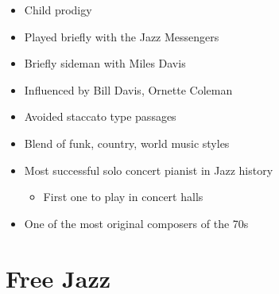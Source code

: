 \documentclass[]{article}
\providecommand{\tightlist}{%
  \setlength{\itemsep}{0pt}\setlength{\parskip}{0pt}}
\begin{document}
\begin{enumerate}
  \begin{itemize}
  \tightlist
  \item
    Child prodigy
  \item
    Played briefly with the Jazz Messengers
  \item
    Briefly sideman with Miles Davis
  \item
    Influenced by Bill Davis, Ornette Coleman
  \item
    Avoided staccato type passages
  \item
    Blend of funk, country, world music styles
  \item
    Most successful solo concert pianist in Jazz history

    \begin{itemize}
    \tightlist
    \item
      First one to play in concert halls
    \end{itemize}
  \item
    One of the most original composers of the 70s
  \end{itemize}
\end{enumerate}

\section{Free Jazz}\label{free-jazz}
\end{document}
